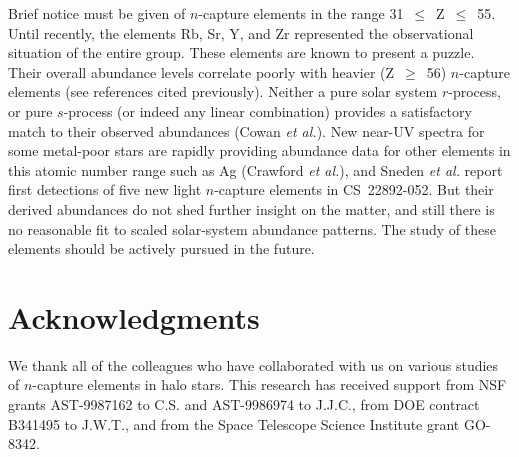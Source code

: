                                                                                                                                                                                                                                                                                                                                                                                                                                                                                                                                                                                                                                                                                                                                                                                                                                                                                                                                                                                                                                                                                                                                                                                                                                                                                                                                                                                                                                                                                                                                                                                                                                                                                                                                                                                                                                                                                                                                                                                                                                                                                                                                                                                                                                                                                                                                                                                                                                                                                                                                                                                                                                                                                                                                                                                                                                                                                                                                                                                                                                                                                                                                                                                                                                                                                                                                                                                                                                                                                                                                                                                                                                                                                                                                                                                                                                                                                                                                                                                                                                                                                                                                                                                                                                                                                                                                                                                                                                                                                                                                                                                                                                                                                                                                                                                                                                                                                                                                                                                                                                                                                                                                                                                                                                                                                                                                                                                                                                                                                                                                                                                                                                                                                                                                                                                                                                                                                                                                                                                                                                                                                                                                                                                                                                                                                                                                                                                                                                                                                                                                                                                                                                                                                                                                                                                                                                                                                                                                                                                                                                                                                                                                                                                                                                                                                                                                                                                                                                                                                                                                                                                                                                                                                                                                                                                                                                                                                                                                                                                                                                                                                                                                                                                                                                                                                                                                                                                                                                                                                                                                                                                                                                                                                                                                                                                                                                                                                                                                                                                                                                                                                                                                                                                                                                                                                                                                                                                                                                                                                                                                                                                                                                                                                                                                                                                                                                                                                                                                                                                                                                                                                                                                                                                                                                                                                                                                                                                                                                                                                                                                                                                                                                                                                                                                                                                                                                                                                                                                                                                                                                                                                                                                                                                                                                                                                                                                                                                                                                                                                                                                                                                                                                                                                                                                                                                                                                                                                                                                                                                                                                                                                                                                                                                                                                                                                                                                                                                                                                                                                                                                                                                                                                                                                                                                                                                                                                                                                                                                                                                                                                                                                                                                                                                                                                                                                                                                                                                                                                                                                                                                                                                                                                                                                                                                                                                                                                                                                                                                                                                                                                                                                                                                                                                                                                                                                                                                                                                                                                                                                                                                                                                                                                                                                                                                                                                                                                                                                                                                                                                                                                                                                                                                                                                                                                                                                                                                                                                                                                                                                                                                                                                                                                                                                                                                                                                            \documentclass{ws-p8-50x6-00}
\begin{document}
Brief notice must be given of $n$-capture elements in the range 
31~$\leq$~Z~$\leq$~55.  
Until recently, the elements Rb, Sr, Y, and Zr represented the observational
situation of the entire group.  
These elements are known to present a puzzle.  
Their overall abundance levels correlate poorly with heavier (Z~$\geq$~56)
$n$-capture elements (see references cited previously).  
Neither a pure solar system $r$-process, or pure $s$-process 
(or indeed any linear combination) provides a satisfactory match to their 
observed abundances (Cowan {\it et al.}\cite{Co95}).  
New near-UV spectra for some metal-poor stars are rapidly providing 
abundance data for other elements in this atomic number range such as Ag 
(Crawford {\it et al.}\cite{Cr98}), and Sneden {\it et al.}\cite{Sn00}
report first detections of five new light $n$-capture elements in 
CS~22892-052. 
But their derived abundances do not shed further insight on the matter, and 
still there is no reasonable fit to scaled solar-system abundance patterns.  
The study of these elements should be actively pursued in the future. 




\section*{Acknowledgments}
We thank all of the colleagues who have collaborated with us on various
studies of $n$-capture elements in halo stars.
This research has received support from NSF grants AST-9987162 to C.S. and
AST-9986974 to J.J.C., from DOE contract B341495 to J.W.T., and from the Space
Telescope Science Institute grant GO-8342.
\end{document}
